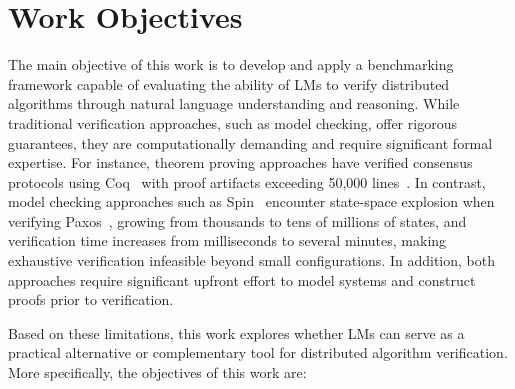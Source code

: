 \section{Work Objectives}
The main objective of this work is to develop and apply a benchmarking framework capable of evaluating the ability of LMs to verify distributed algorithms through natural language understanding and reasoning. While traditional verification approaches, such as model checking, offer rigorous guarantees, they are computationally demanding and require significant formal expertise. For instance, theorem proving approaches have verified consensus protocols using Coq~\cite{coq1996} with proof artifacts exceeding 50,000 lines~\cite{wilcox2015thesis,wilcox2015verdi}. In contrast, model checking approaches such as Spin~\cite{holzmann1997spin} encounter state-space explosion when verifying Paxos~\cite{Delzanno_2014}, growing from thousands to tens of millions of states, and verification time increases from milliseconds to several minutes, making exhaustive verification infeasible beyond small configurations. In addition, both approaches require significant upfront effort to model systems and construct proofs prior to verification.

Based on these limitations, this work explores whether LMs can serve as a practical alternative or complementary tool for distributed algorithm verification. More specifically, the objectives of this work are:

